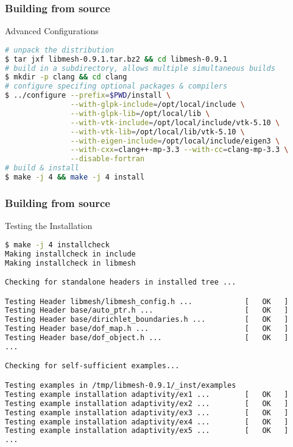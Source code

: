 \begin{frame}[fragile]
  \frametitle{Building \libMesh{} from source}

  \begin{block}{Advanced Configurations}
    \begin{lstlisting}[language=bash]
# unpack the distribution
$ tar jxf libmesh-0.9.1.tar.bz2 && cd libmesh-0.9.1
# build in a subdirectory, allows multiple simultaneous builds
$ mkdir -p clang && cd clang
# configure specifing optional packages & compilers
$ ../configure --prefix=$PWD/install \
               --with-glpk-include=/opt/local/include \
               --with-glpk-lib=/opt/local/lib \
               --with-vtk-include=/opt/local/include/vtk-5.10 \
               --with-vtk-lib=/opt/local/lib/vtk-5.10 \
               --with-eigen-include=/opt/local/include/eigen3 \
               --with-cxx=clang++-mp-3.3 --with-cc=clang-mp-3.3 \
               --disable-fortran
# build & install
$ make -j 4 && make -j 4 install
    \end{lstlisting}
  \end{block}
\end{frame}



\begin{frame}[fragile,shrink]
  \frametitle{Building \libMesh{} from source}

  \begin{block}{Testing the Installation}
    \begin{lstlisting}[language=bash]
$ make -j 4 installcheck
Making installcheck in include
Making installcheck in libmesh

Checking for standalone headers in installed tree ...

Testing Header libmesh/libmesh_config.h ...            [   OK   ]
Testing Header base/auto_ptr.h ...                     [   OK   ]
Testing Header base/dirichlet_boundaries.h ...         [   OK   ]
Testing Header base/dof_map.h ...                      [   OK   ]
Testing Header base/dof_object.h ...                   [   OK   ]
...

Checking for self-sufficient examples...

Testing examples in /tmp/libmesh-0.9.1/_inst/examples
Testing example installation adaptivity/ex1 ...        [   OK   ]
Testing example installation adaptivity/ex2 ...        [   OK   ]
Testing example installation adaptivity/ex3 ...        [   OK   ]
Testing example installation adaptivity/ex4 ...        [   OK   ]
Testing example installation adaptivity/ex5 ...        [   OK   ]
...
    \end{lstlisting}
  \end{block}
\end{frame}



